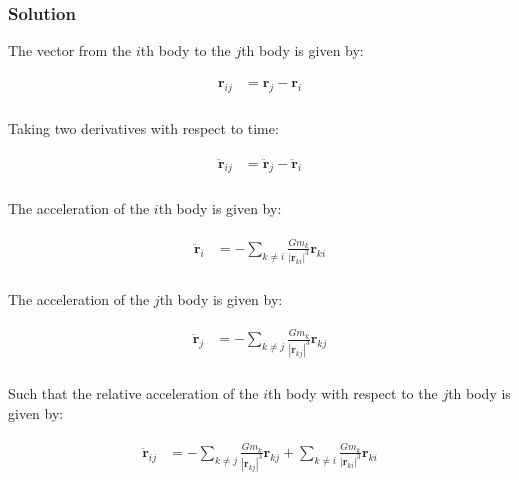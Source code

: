 \documentclass[
]{article}
\begin{document}
\subsubsection{Solution}\label{solution}

The vector from the \(i\)th body to the \(j\)th body is given by:

\[\begin{aligned}
\begin{aligned}
    \mathbf{r}_{ij} &= \mathbf{r}_j - \mathbf{r}_i \\
\end{aligned}
\end{aligned}\]

Taking two derivatives with respect to time:

\[\begin{aligned}
\begin{aligned}
    \ddot{\mathbf{r}}_{ij} &= \ddot{\mathbf{r}}_j - \ddot{\mathbf{r}}_i \\
\end{aligned}
\end{aligned}\]

The acceleration of the \(i\)th body is given by:

\[\begin{aligned}
\begin{aligned}
    \ddot{\mathbf{r}}_i &= - \sum_{k\neq i} \frac{G m_k}{\left| \mathbf{r}_{ki} \right|^3} \mathbf{r}_{ki} \\
\end{aligned}
\end{aligned}\]

The acceleration of the \(j\)th body is given by:

\[\begin{aligned}
\begin{aligned}
    \ddot{\mathbf{r}}_j &= -\sum_{k\neq j} \frac{G m_k}{\left| \mathbf{r}_{kj} \right|^3} \mathbf{r}_{kj} \\
\end{aligned}
\end{aligned}\]

Such that the relative acceleration of the \(i\)th body with respect to
the \(j\)th body is given by:

\[\begin{aligned}
\begin{aligned}
    \ddot{\mathbf{r}}_{ij} &= -\sum_{k\neq j} \frac{G m_k}{\left| \mathbf{r}_{kj} \right|^3} \mathbf{r}_{kj} + \sum_{k\neq i} \frac{G m_k}{\left| \mathbf{r}_{ki} \right|^3} \mathbf{r}_{ki} \\
\end{aligned}
\end{aligned}\]
\end{document}

